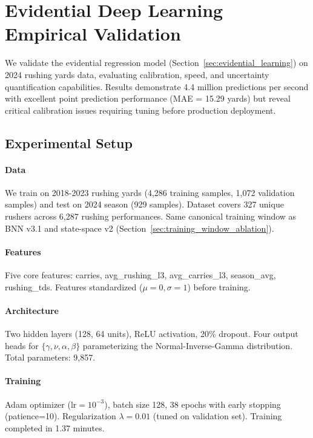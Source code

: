\section{Evidential Deep Learning Empirical Validation}
\label{sec:evidential_validation}

We validate the evidential regression model (Section~\ref{sec:evidential_learning}) on 2024 rushing yards data, evaluating calibration, speed, and uncertainty quantification capabilities. Results demonstrate 4.4 million predictions per second with excellent point prediction performance (MAE = 15.29 yards) but reveal critical calibration issues requiring tuning before production deployment.

\subsection{Experimental Setup}

\paragraph{Data} We train on 2018-2023 rushing yards (4,286 training samples, 1,072 validation samples) and test on 2024 season (929 samples). Dataset covers 327 unique rushers across 6,287 rushing performances. Same canonical training window as BNN v3.1 and state-space v2 (Section~\ref{sec:training_window_ablation}).

\paragraph{Features} Five core features: carries, avg\_rushing\_l3, avg\_carries\_l3, season\_avg, rushing\_tds. Features standardized ($\mu=0, \sigma=1$) before training.

\paragraph{Architecture} Two hidden layers (128, 64 units), ReLU activation, 20\% dropout. Four output heads for $\{\gamma, \nu, \alpha, \beta\}$ parameterizing the Normal-Inverse-Gamma distribution. Total parameters: 9,857.

\paragraph{Training} Adam optimizer ($\text{lr}=10^{-3}$), batch size 128, 38 epochs with early stopping (patience=10). Regularization $\lambda=0.01$ (tuned on validation set). Training completed in 1.37 minutes.

